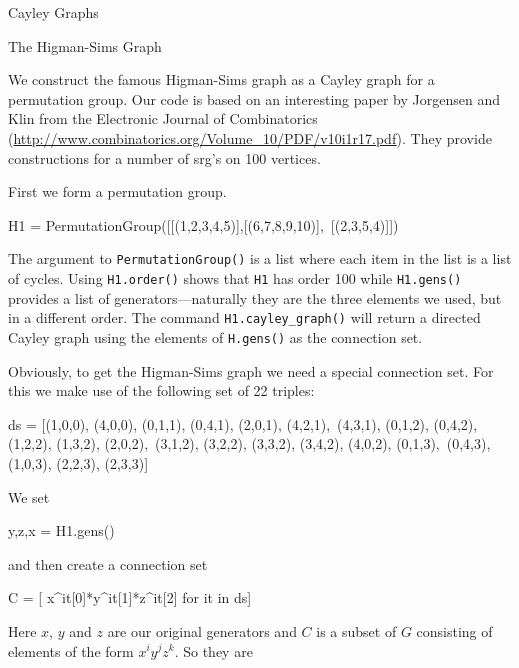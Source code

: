 \begin{chap}{Cayley Graphs}
\begin{sect}{The Higman-Sims Graph}
%
\begin{para}
We construct the famous Higman-Sims graph as a Cayley graph for a permutation
group. Our code is based on an interesting paper by Jorgensen and Klin
from the Electronic Journal of Combinatorics
(\url{http://www.combinatorics.org/Volume_10/PDF/v10i1r17.pdf}).
They provide constructions for a number of srg's on 100 vertices.
\end{para}
%
\begin{para}
First we form a permutation group.
\end{para}
%
\begin{sageblock}
    H1 = PermutationGroup([[(1,2,3,4,5)],[(6,7,8,9,10)],\
      [(2,3,5,4)]])
\end{sageblock}
%
\begin{para}
The argument to \texttt{PermutationGroup()} is a list where each item in the
list is a list of cycles. Using \verb|H1.order()| shows that \verb|H1| has 
order 100 while \verb|H1.gens()| provides a list of generators---naturally they 
are the three elements we used, but in a different order.
The command \verb|H1.cayley_graph()| will return a directed Cayley graph using
the elements of \verb|H.gens()| as the connection set.
\end{para}
%
\begin{para}
Obviously, to get the Higman-Sims graph we need a special connection set.
For this we make use of the following set of 22 triples:
\end{para}
%
\begin{sageblock}
ds = [(1,0,0), (4,0,0), (0,1,1), (0,4,1), (2,0,1), (4,2,1),\
  (4,3,1), (0,1,2), (0,4,2), (1,2,2), (1,3,2), (2,0,2),\
  (3,1,2), (3,2,2), (3,3,2), (3,4,2), (4,0,2), (0,1,3),\
  (0,4,3), (1,0,3), (2,2,3), (2,3,3)]
\end{sageblock}
%
\begin{para}
We set
\end{para}
%
\begin{sageblock}
    y,z,x = H1.gens()
\end{sageblock}
%
\begin{para}
and then create a connection set
\end{para}
%
\begin{sageblock}
    C = [ x^it[0]*y^it[1]*z^it[2] for it in ds]
\end{sageblock}
%
\begin{para}
Here $x$, $y$ and $z$ are our original generators and $C$ is a subset
of $G$ consisting of elements of the form $x^iy^jz^k$. So they are

\end{para}
\end{sect}
\end{chap}

